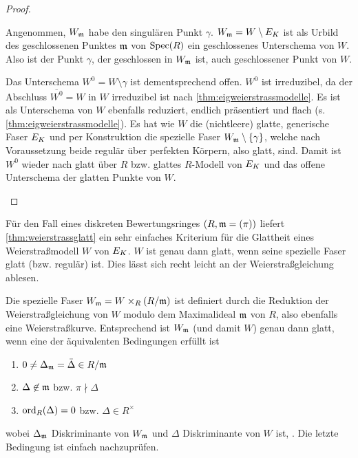 \begin{Lemma}
\begin{proof}
\begin{enumerate}[label=(\alph*)]
      Angenommen, $W_{\mathfrak{m}}$ habe den singulären Punkt $\gamma$.
      $W_{\mathfrak{m}}=W\setminus E_{K}$ ist als Urbild des geschlossenen Punktes
      $\mathfrak{m}$ von $\operatorname{Spec}(R)$ ein geschlossenes Unterschema von $W$.
      Also ist der Punkt $\gamma$, der geschlossen in $W_{\mathfrak{m}}$ ist, auch
      geschlossener Punkt von $W$.
      
      Das Unterschema $W^0=W\setminus\gamma$ ist dementsprechend offen.
      $W^0$ ist irreduzibel, da der Abschluss $\overline{W^0}=W$ in
      $W$ irreduzibel ist nach \ref{thm:eigweierstrassmodelle}.
      Es ist als Unterschema von $W$ ebenfalls reduziert, endlich
      präsentiert und flach (s. \ref{thm:eigweierstrassmodelle}).
      Es hat wie $W$ die (nichtleere) glatte, generische Faser $E_{K}$ und
      per Konstruktion die spezielle Faser $W_{\mathfrak{m}}\setminus\{\gamma\}$,
      welche nach Voraussetzung beide regulär über perfekten Körpern,
      also glatt, sind.
      Damit ist $W^0$ wieder nach \cite[8.5, Proposition 17]{bosch}
      glatt über $R$ bzw. glattes $R$-Modell von $E_{K}$ und das offene
      Unterschema der glatten Punkte von $W$.
    \end{enumerate}
  \end{proof}
\end{Lemma}

\begin{Bemerkung}\label{thm:weierstraßmodellglatt}
  Für den Fall eines diskreten Bewertungsringes $(R,\mathfrak{m}=(\pi))$ liefert
  \ref{thm:weierstrassglatt} ein sehr einfaches Kriterium für die
  Glattheit eines Weierstraßmodell $W$ von $E_{K}$.
  $W$ ist genau dann glatt, wenn seine spezielle Faser glatt
  (bzw. regulär) ist.
  Dies lässt sich recht leicht an der Weierstraßgleichung ablesen.
  
  Die spezielle Faser $W_{\mathfrak{m}}=W\times_R (R/\mathfrak{m})$ ist definiert
  durch die Reduktion der Weierstraßgleichung von $W$ modulo dem
  Maximalideal $\mathfrak{m}$ von $R$, also ebenfalls eine Weierstraßkurve.
  Entsprechend ist $W_{\mathfrak{m}}$ (und damit $W$) genau dann glatt, wenn
  eine der äquivalenten Bedingungen erfüllt ist
  \begin{enumerate}[label=(\roman*)]
  \item $0\neq\Delta_{\mathfrak{m}}=\bar\Delta\in R/\mathfrak{m}$
  \item $\Delta\not\in\mathfrak{m}$ bzw. $\pi\nmid\Delta$
  \item $\operatorname{ord}_R(\Delta)=0$ bzw. $\Delta\in R^\times$
  \end{enumerate}
  wobei $\Delta_{\mathfrak{m}}$ Diskriminante von $W_{\mathfrak{m}}$ und $\Delta$
  Diskriminante von $W$ ist,
  \cite[vgl.][Proposition VII.5.1 (a)]{silverman}.
  Die letzte Bedingung ist einfach nachzuprüfen.
\end{Bemerkung}

